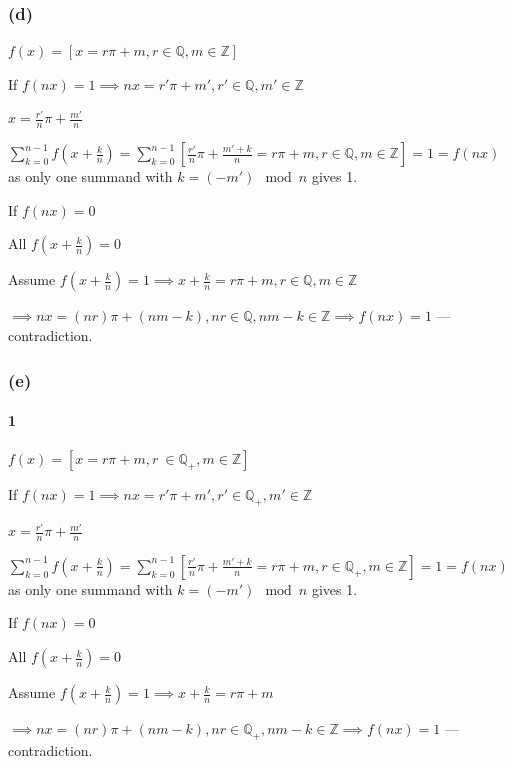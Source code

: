 \documentclass{article}
\begin{document}
\subsubsection*{(d)}

\( f(x) = [x = r \pi + m, r \in \mathbb{Q}, m \in \mathbb{Z}] \)

If \( f(nx) = 1 \implies nx = r' \pi + m', r' \in \mathbb{Q}, m' \in \mathbb{Z} \)

\( x = \frac{r'}{n} \pi + \frac{m'}{n} \)

\( \sum_{k=0}^{n-1} f(x+\frac{k}{n}) = \sum_{k=0}^{n-1} [\frac{r'}{n} \pi + \frac{m'+k}{n} = r\pi + m, r \in \mathbb{Q}, m \in \mathbb{Z}] = 1 = f(nx) \) as only one summand with \( k = (-m') \mod n \) gives 1.

If \( f(nx) = 0 \)

All \( f(x+\frac{k}{n}) = 0 \)

Assume \( f(x+\frac{k}{n}) = 1 \implies x + \frac{k}{n} = r\pi + m, r \in \mathbb{Q}, m \in \mathbb{Z} \)

\( \implies nx = (nr)\pi + (nm - k), nr \in \mathbb{Q}, nm - k \in \mathbb{Z} \implies f(nx) = 1 \) --- contradiction.

\subsubsection*{(e)}

\paragraph*{1}

\( f(x) = [x = r \pi + m, r\ \in \mathbb{Q_+}, m \in \mathbb{Z}] \)

If \( f(nx) = 1 \implies nx = r' \pi + m', r' \in \mathbb{Q_+}, m' \in \mathbb{Z} \)

\( x = \frac{r'}{n} \pi + \frac{m'}{n} \)

\( \sum_{k=0}^{n-1} f(x+\frac{k}{n}) = \sum_{k=0}^{n-1} [\frac{r'}{n} \pi + \frac{m'+k}{n} = r\pi + m, r \in \mathbb{Q_+}, m \in \mathbb{Z}] = 1 = f(nx) \) as only one summand with \( k = (-m') \mod n \) gives 1.

If \( f(nx) = 0 \)

All \( f(x+\frac{k}{n}) = 0 \)

Assume \( f(x+\frac{k}{n}) = 1 \implies x + \frac{k}{n} = r\pi + m \)

\( \implies nx = (nr)\pi + (nm - k), nr \in \mathbb{Q_+}, nm - k \in \mathbb{Z} \implies f(nx) = 1 \) --- contradiction.
\end{document}
